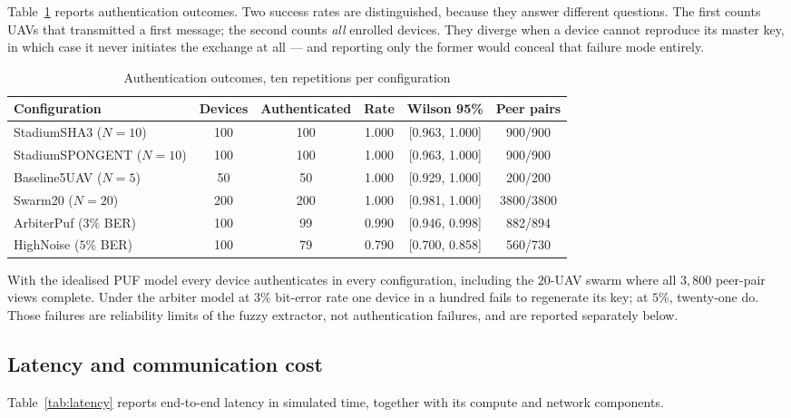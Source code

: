 \documentclass[11pt,a4paper]{article}
\begin{document}
Table~\ref{tab:functional} reports authentication outcomes. Two success rates are
distinguished, because they answer different questions. The first counts UAVs that
transmitted a first message; the second counts \emph{all} enrolled devices. They
diverge when a device cannot reproduce its master key, in which case it never
initiates the exchange at all --- and reporting only the former would conceal that
failure mode entirely.

\begin{table}[H]
\centering
\caption{Authentication outcomes, ten repetitions per configuration}
\label{tab:functional}
\small
\begin{tabular}{@{}lccccc@{}}
\toprule
\textbf{Configuration} & \textbf{Devices} & \textbf{Authenticated} &
\textbf{Rate} & \textbf{Wilson 95\%} & \textbf{Peer pairs} \\
\midrule
StadiumSHA3 ($N{=}10$)      & 100 & 100 & 1.000 & [0.963, 1.000] & 900/900 \\
StadiumSPONGENT ($N{=}10$)  & 100 & 100 & 1.000 & [0.963, 1.000] & 900/900 \\
Baseline5UAV ($N{=}5$)      & 50  & 50  & 1.000 & [0.929, 1.000] & 200/200 \\
Swarm20 ($N{=}20$)          & 200 & 200 & 1.000 & [0.981, 1.000] & 3800/3800 \\
ArbiterPuf ($3\%$ BER)      & 100 & 99  & 0.990 & [0.946, 0.998] & 882/894 \\
HighNoise ($5\%$ BER)       & 100 & 79  & 0.790 & [0.700, 0.858] & 560/730 \\
\bottomrule
\end{tabular}
\end{table}

With the idealised PUF model every device authenticates in every configuration,
including the $20$-UAV swarm where all $3{,}800$ peer-pair views complete. Under
the arbiter model at $3\%$ bit-error rate one device in a hundred fails to
regenerate its key; at $5\%$, twenty-one do. Those failures are reliability
limits of the fuzzy extractor, not authentication failures, and are reported
separately below.

\subsection{Latency and communication cost}

Table~\ref{tab:latency} reports end-to-end latency in simulated time, together
with its compute and network components.
\end{document}
